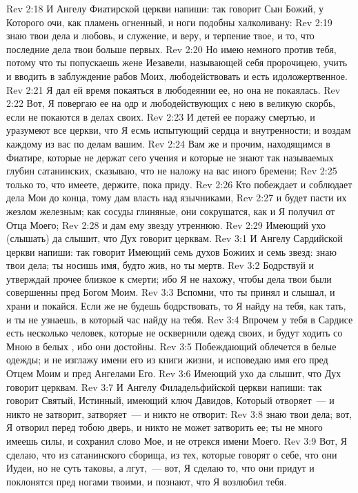 \rsbpar\vs Rev 2:18 И Ангелу Фиатирской церкви напиши: так говорит Сын Божий, у Которого очи, как пламень огненный, и ноги подобны халколивану:
\vs Rev 2:19 знаю твои дела и любовь, и служение, и веру, и терпение твое, и то, что последние дела твои больше первых.
\vs Rev 2:20 Но имею немного против тебя, потому что ты попускаешь жене Иезавели, называющей себя пророчицею, учить и вводить в заблуждение рабов Моих, любодействовать и есть идоложертвенное.
\vs Rev 2:21 Я дал ей время покаяться в любодеянии ее, но она не покаялась.
\vs Rev 2:22 Вот, Я повергаю ее на одр и любодействующих с нею в великую скорбь, если не покаются в делах своих.
\vs Rev 2:23 И детей ее поражу смертью, и уразумеют все церкви, что Я есмь испытующий сердца и внутренности; и воздам каждому из вас по делам вашим.
\vs Rev 2:24 Вам же и прочим, находящимся в Фиатире, которые не держат сего учения и которые не знают так называемых глубин сатанинских, сказываю, что не наложу на вас иного бремени;
\vs Rev 2:25 только то, что имеете, держите, пока приду.
\vs Rev 2:26 Кто побеждает и соблюдает дела Мои до конца, тому дам власть над язычниками,
\vs Rev 2:27 и будет пасти их жезлом железным; как сосуды глиняные, они сокрушатся, как и Я получил  от Отца Моего;
\vs Rev 2:28 и дам ему звезду утреннюю.
\vs Rev 2:29 Имеющий ухо (слышать) да слышит, что Дух говорит церквам.
\vs Rev 3:1 И Ангелу Сардийской церкви напиши: так говорит Имеющий семь духов Божиих и семь звезд: знаю твои дела; ты носишь имя, будто жив, но ты мертв.
\vs Rev 3:2 Бодрствуй и утверждай прочее близкое к смерти; ибо Я не нахожу, чтобы дела твои были совершенны пред Богом Моим.
\vs Rev 3:3 Вспомни, что ты принял и слышал, и храни и покайся. Если же не будешь бодрствовать, то Я найду на тебя, как тать, и ты не узнаешь, в который час найду на тебя.
\vs Rev 3:4 Впрочем у тебя в Сардисе есть несколько человек, которые не осквернили одежд своих, и будут ходить со Мною в белых , ибо они достойны.
\vs Rev 3:5 Побеждающий облечется в белые одежды; и не изглажу имени его из книги жизни, и исповедаю имя его пред Отцем Моим и пред Ангелами Его.
\vs Rev 3:6 Имеющий ухо да слышит, что Дух говорит церквам.
\rsbpar\vs Rev 3:7 И Ангелу Филадельфийской церкви напиши: так говорит Святый, Истинный, имеющий ключ Давидов, Который отворяет~--- и никто не затворит, затворяет~--- и никто не отворит:
\vs Rev 3:8 знаю твои дела; вот, Я отворил перед тобою дверь, и никто не может затворить ее; ты не много имеешь силы, и сохранил слово Мое, и не отрекся имени Моего.
\vs Rev 3:9 Вот, Я сделаю, что из сатанинского сборища, из тех, которые говорят о себе, что они Иудеи, но не суть таковы, а лгут,~--- вот, Я сделаю то, что они придут и поклонятся пред ногами твоими, и познают, что Я возлюбил тебя.
